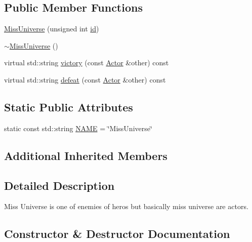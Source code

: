 \subsection*{Public Member Functions}
\begin{DoxyCompactItemize}
\item 
\hyperlink{classMissUniverse_ad335e8f67b5c4610f7e5a5f6aaf9b08a}{Miss\+Universe} (unsigned int \hyperlink{classActor_a084438abd4bcb9d5e17b8ad75b0f5984}{id})
\item 
\hyperlink{classMissUniverse_a1a6988dbc5ae8efbef9ec1c9ce4d6cce}{$\sim$\+Miss\+Universe} ()
\item 
virtual std\+::string \hyperlink{classMissUniverse_aac659076d954d5342ba494a993eab2fd}{victory} (const \hyperlink{classActor}{Actor} \&other) const 
\item 
virtual std\+::string \hyperlink{classMissUniverse_af8842e3ec345796fcdadca07a79442b0}{defeat} (const \hyperlink{classActor}{Actor} \&other) const 
\end{DoxyCompactItemize}
\subsection*{Static Public Attributes}
\begin{DoxyCompactItemize}
\item 
static const std\+::string \hyperlink{classMissUniverse_a8030bea29113f33925240bdcce5efd45}{N\+A\+ME} = \char`\"{}Miss\+Universe\char`\"{}
\end{DoxyCompactItemize}
\subsection*{Additional Inherited Members}


\subsection{Detailed Description}
Miss Universe is one of enemies of hero\textquotesingle{}s but basically miss universe are actors. 

\subsection{Constructor \& Destructor Documentation}

